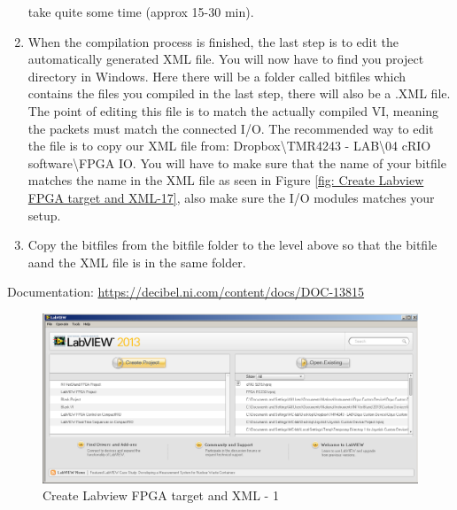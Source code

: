 \documentclass[a4paper,twoside,english]{report}
\begin{document}
\begin{enumerate}
take quite some time (approx 15-30 min).
\item When the compilation process is finished, the last step is to edit
the automatically generated XML file. You will now have to find you
project directory in Windows. Here there will be a folder called bitfiles
which contains the files you compiled in the last step, there will
also be a .XML file. The point of editing this file is to match the
actually compiled VI, meaning the packets must match the connected
I/O. The recommended way to edit the file is to copy our XML file
from: Dropbox\textbackslash{}TMR4243 - LAB\textbackslash{}04 cRIO
software\textbackslash{}FPGA IO. You will have to make sure that the
name of your bitfile matches the name in the XML file as seen in Figure
\ref{fig: Create Labview FPGA target and XML-17}, also make sure
the I/O modules matches your setup.
\item Copy the bitfiles from the bitfile folder to the level above so that
the bitfile aand the XML file is in the same folder.
\end{enumerate}
Documentation: \url{https://decibel.ni.com/content/docs/DOC-13815}

\begin{figure}[!h]
\centering \includegraphics[scale=0.45]{Screenshots/Screenshot_2015-01-16_19-21-16.png}
\caption{Create Labview FPGA target and XML - 1}

\label{fig: Create Labview FPGA target and XML-1} 
\end{figure}
\end{document}
